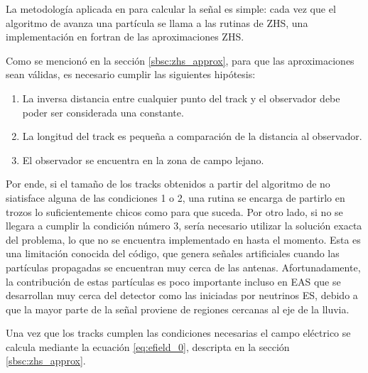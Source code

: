 		La metodolog\'ia aplicada en \zhs{} para calcular la se\~nal es simple: cada vez que el algoritmo de \aires{} avanza una part\'icula se llama a las rutinas de ZHS, una implementaci\'on en fortran de las aproximaciones ZHS.

		Como se mencion\'o en la secci\'on \ref{sbsc:zhs_approx}, para que las aproximaciones sean v\'alidas, es necesario cumplir las siguientes hip\'otesis:
		\begin{enumerate}
		\item La inversa distancia entre cualquier punto del track y el observador debe poder ser considerada una constante.
		\item La longitud del track es peque\~na a comparaci\'on de la distancia al observador.
		\item El observador se encuentra en la zona de campo lejano.
		\end{enumerate}
		Por ende, si el tama\~no de los tracks obtenidos a partir del algoritmo de \aires{} no siatisface alguna de las condiciones 1 o 2, una rutina se encarga de partirlo en trozos lo suficientemente chicos como para que suceda.
		Por otro lado, si no se llegara a cumplir la condici\'on n\'umero 3, ser\'ia necesario utilizar la soluci\'on exacta del problema, lo que no se encuentra implementado en \zhs{} hasta el momento.
		Esta es una limitaci\'on conocida del c\'odigo, que genera se\~nales artificiales cuando las part\'iculas propagadas se encuentran muy cerca de las antenas.
		Afortunadamente, la contribuci\'on de estas part\'iculas es poco importante incluso en EAS que se desarrollan muy cerca del detector como las iniciadas por neutrinos ES, debido a que la mayor parte de la se\~nal proviene de regiones cercanas al eje de la lluvia.
		
		Una vez que los tracks cumplen las condiciones necesarias el campo el\'ectrico se calcula mediante la ecuaci\'on \ref{eq:efield_0}, descripta en la secci\'on \ref{sbsc:zhs_approx}.
		
